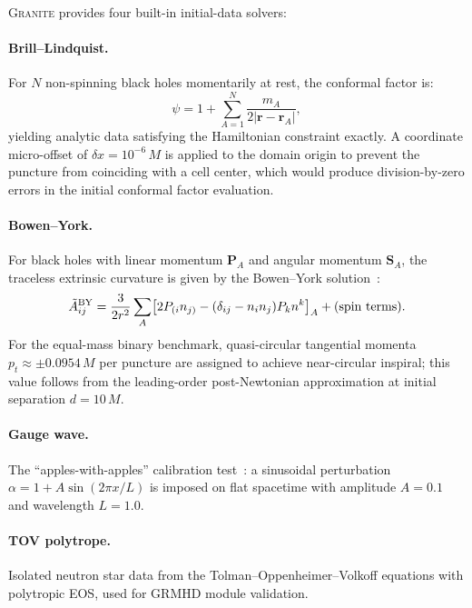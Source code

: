 \documentclass[aps,prd,twocolumn,superscriptaddress,nofootinbib,showpacs,
               longbibliography]{revtex4-2}
\newcommand{\granite}{\textsc{Granite}}
\begin{document}
\granite{} provides four built-in initial-data solvers:

\paragraph{Brill--Lindquist.}
For $N$ non-spinning black holes momentarily at rest, the conformal factor is:
\begin{equation}
  \psi = 1 + \sum_{A=1}^{N} \frac{m_A}{2|\mathbf{r} - \mathbf{r}_A|},
\end{equation}
yielding analytic data satisfying the Hamiltonian constraint exactly.
A coordinate micro-offset of $\delta x = 10^{-6}\,M$ is applied to the domain
origin to prevent the puncture from coinciding with a cell center, which would
produce division-by-zero errors in the initial conformal factor evaluation.

\paragraph{Bowen--York.}
For black holes with linear momentum $\mathbf{P}_A$ and angular momentum
$\mathbf{S}_A$, the traceless extrinsic curvature is given by the
Bowen--York solution~\cite{BrandtBrugmann1997}:
\begin{equation}
  \tilde A^{\rm BY}_{ij} = \frac{3}{2r^2}\sum_A
    \bigl[2P_{(i}n_{j)} - (\delta_{ij} - n_in_j)P_kn^k\bigr]_A
    + \text{(spin terms)}.
\end{equation}
For the equal-mass binary benchmark, quasi-circular tangential momenta
$p_t \approx \pm 0.0954\,M$ per puncture are assigned to achieve
near-circular inspiral; this value follows from the leading-order
post-Newtonian approximation at initial separation $d = 10\,M$.

\paragraph{Gauge wave.}
The ``apples-with-apples'' calibration test~\cite{Alcubierre2008}: a
sinusoidal perturbation
$\alpha = 1 + A\sin(2\pi x/L)$ is imposed on flat spacetime with amplitude
$A = 0.1$ and wavelength $L = 1.0$.

\paragraph{TOV polytrope.}
Isolated neutron star data from the Tolman--Oppenheimer--Volkoff equations
with polytropic EOS, used for GRMHD module validation.
\end{document}
